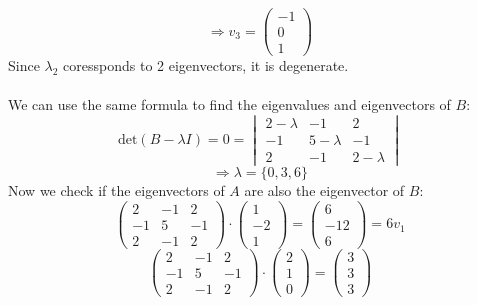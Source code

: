 \documentclass{article}
\begin{document}
    \[\Rightarrow v_3 =
    \begin{pmatrix}
        -1 \\
        0 \\
        1
    \end{pmatrix}
    \]
Since \(\lambda_2\) coressponds to 2 eigenvectors, it is degenerate.
\\ \\
We can use the same formula to find the eigenvalues and eigenvectors of \(B\):
\[\text{det}(B - \lambda I) = 0 =
\begin{vmatrix}
    2 - \lambda & -1 & 2 \\
    -1 & 5 - \lambda & -1 \\
    2 & -1 & 2- \lambda 
\end{vmatrix}
\]
\[\Rightarrow \lambda = \{0, 3, 6\}\]
Now we check if the eigenvectors of \(A\) are also the eigenvector of \(B\):
\begin{equation*}
    \begin{pmatrix}
        2 & -1 & 2 \\
        -1 & 5 & -1 \\
        2 & -1 & 2 
    \end{pmatrix}
    \cdot
    \begin{pmatrix}
        1 \\
        -2 \\
        1
    \end{pmatrix}
    = 
    \begin{pmatrix}
        6 \\
        -12 \\
        6
    \end{pmatrix}
    = 6v_1
\end{equation*}
\begin{equation*}
    \begin{pmatrix}
        2 & -1 & 2 \\
        -1 & 5 & -1 \\
        2 & -1 & 2 
    \end{pmatrix}
    \cdot
    \begin{pmatrix}
        2 \\
        1 \\
        0
    \end{pmatrix}
    =
    \begin{pmatrix}
        3 \\
        3 \\
        3
    \end{pmatrix}
\end{equation*}
\end{document}
